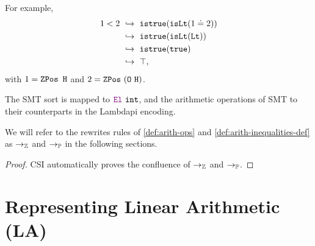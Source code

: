 \begin{example}
For example,
\begin{align*}
  1 < 2
  &\ \hookrightarrow\ \texttt{istrue}(\texttt{isLt}(1 \doteq 2)) \\
  &\ \hookrightarrow\ \texttt{istrue}(\texttt{isLt}(\texttt{Lt})) \\
  &\ \hookrightarrow\ \texttt{istrue}(\texttt{true}) \\
  &\ \hookrightarrow\ \top,
\end{align*}
with $1 = \mathop{\texttt{ZPos}}~\texttt{H}$ and $2 = \mathop{\texttt{ZPos}}~(\texttt{O}~\texttt{H})$.
\end{example}

The SMT sort  is mapped to $\el~\texttt{int}$, and the arithmetic operations of SMT to their counterparts in the Lambdapi encoding.

\begin{notation}
We will refer to the rewrites rules of \cref{def:arith-ops} and \cref{def:arith-inequalities-def} as $\rightarrow_{\mathbb{Z}}$ and $\rightarrow_\mathbb{P}$ in the following sections.
\end{notation}

\begin{lemma}
\begin{proof}
CSI \cite{CSI} automatically proves the confluence of $\rightarrow_\mathbb{Z}$ and $\rightarrow_\mathbb{P}$.
\end{proof}
\label{lemma:confluenceZP}
\end{lemma}

\section{Representing Linear Arithmetic (\textbf{LA})}
\label{ssec:encoding-la}



